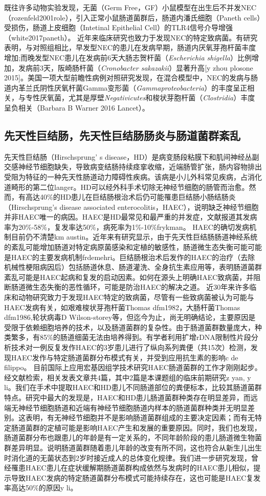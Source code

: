 既往许多动物实验发现，无菌（Germ Free，GF）小鼠模型在出生后不并发NEC\cite{}（rozenfeld2001role），引入正常小鼠肠道菌群后，肠道内潘氏细胞（Paneth cells）受损伤，肠道上皮细胞（Intetinal Epithelial Cell）的TLR4信号介导增强\cite{}（white2017paneth）。
近年来临床研究也致力于发现NEC的特定致病菌。有研究表明，与对照组相比，早发型NEC的患儿在发病早期，肠道内厌氧芽孢杆菌丰度增加;而晚发型NEC患儿在发病前6天大肠志贺杆菌（\textit{Escherichia shigella}）比例增加，发病前3天，阪崎肠杆菌（\textit{Cronobacter sakazakii}）显著升高\cite{}[y zhou plosone 2015]。美国一项大型前瞻性病例对照研究发现，在混合模型中，NEC的发病与肠道内革兰氏阴性厌氧杆菌Gamma变形菌（\textit{Gammaproteobacteria}）的丰度呈正相关，与专性厌氧菌，尤其是厚壁\textit{Negativicutes}和梭状芽胞杆菌（\textit{Clostridia}）丰度呈负相关（Barbara B Warner 2016 Lancet）。
\subsection{先天性巨结肠，先天性巨结肠肠炎与肠道菌群紊乱}
先天性巨结肠（Hirschsprung’ s disease，HD）是病变肠段粘膜下和肌间神经丛副交感神经节细胞缺失，导致病变结肠持续痉挛收缩，近端肠管扩张，肠内容物排出受阻为特征的一种先天性肠道动力障碍性疾病。该病是小儿外科常见疾病，占消化道畸形的第二位{langer}。HD可以经外科手术切除无神经节细胞的肠管而治愈。然而，有高达40\%的HD患儿在巨结肠根治术后仍可能罹患巨结肠小肠结肠炎（Hirschsprung’s disease associated enterocolitis，HAEC），说明缺乏神经节细胞并非HAEC唯一的病因。HAEC是HD最常见和最严重的并发症，文献报道其发病率为20\%-58\%，复发率达50\%，病死率为1\%-10\%{frykman}。
HAEC的确切发病机制目前仍不清楚{km austin}。近年来有研究显示，由于先天性巨结肠肠道神经系统的紊乱可能增加肠道对特定病原菌感染和定植的敏感性，肠道微生态失衡可能可能是HAEC的主要发病机制{frdemehri}。巨结肠根治术后发作的HAEC的治疗（去除机械性梗阻病因后）包括肠道休息、肠道灌洗、全身抗生素应用等，表明肠道菌群紊乱可能是HAEC起病和复发的启动因素。如何在源头上明确HAEC致病菌，并阻断肠道微生态失衡的恶性循环，可能是防治HAEC的解决之道。
近30年来许多临床和动物研究致力于发现HAEC特定的致病菌，尽管有一些致病菌被认为可能与HAEC发病有关，如艰难梭状芽孢杆菌{Thomas dfm1982}，大肠杆菌{Thomas dfm1986},轮状病毒{D Wilson-storey}等，但迄今为止，尚无明确结论，主要原因是受限于依赖细胞培养的技术，以及肠道菌群的复杂性。由于肠道菌群数量庞大，种类繁多，有85\%的肠道细菌无法由培养得到。有学者利用扩增rDNA限制性片段分析技术对一例反复发作HAEC的3岁患儿进行了纵向系列粪便（共15次）检测，发现HAEC发作与特定肠道菌群分布模式有关，并受到应用抗生素的影响{c de filippo}。
目前国际上应用宏基因组学技术研究HAEC肠道菌群的工作才刚刚起步。经文献检索，相关发表文章共4篇，其中2篇是本课题组的临床前期研究{z yan, y li}。我们在手术中提取HAEC和HD患儿不同肠道部位的粪便标本，比较其肠道菌群特点。研究中最大的发现是，HAEC和HD患儿肠道菌群种类存在明显差异，而远端无神经节细胞肠道和近端有神经节细胞肠道内样本的肠道菌群种类并无明显差别。这表明，有无神经节细胞并不是影响肠道菌群组成的主要决定因素；而有无特定肠道菌群的定植可能是影响HAEC产生和发展的重要原因。同时，我们也发现，肠道菌群分布也跟患儿的年龄是有一定关系的，不同年龄阶段的患儿肠道微生物菌群差异明显。说明肠道菌群随着患儿年龄的改变有所不同，这也符合从新生儿出生时消化道的无菌状态到2岁时接近成人的总体变化规律。我们进一步研究发现，曾经罹患HAEC患儿在症状缓解期肠道菌群构成依然与发病时的HAEC患儿相似，提示导致HAEC发病的特定肠道菌群分布模式可能持续存在，这也可能是HAEC复发率高达50\%的原因{y li}。

